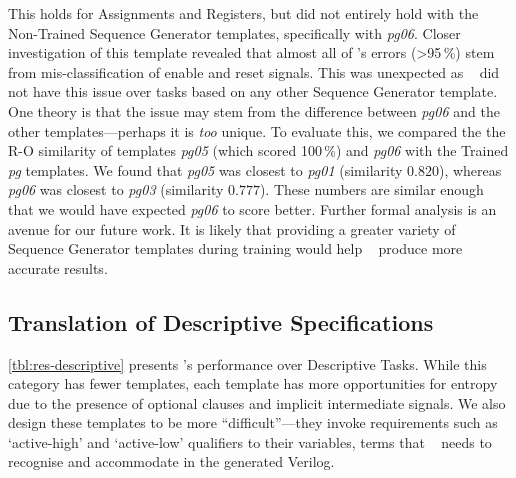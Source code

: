 This holds for Assignments and Registers, but did not entirely hold with the Non-Trained Sequence Generator templates, specifically with \textit{pg06}.
Closer investigation of this template revealed that almost all of \sol's errors (>95\,\%) stem from mis-classification of enable and reset signals. This was unexpected as \sol~ did not have this issue over tasks based on any other Sequence Generator template.
One theory is that the issue may stem from the difference between \textit{pg06} and the other templates---perhaps it is \emph{too} unique. 
To evaluate this, we compared the the R-O similarity of templates \textit{pg05} (which scored 100\,\%) and \textit{pg06} with the Trained \textit{pg} templates.
We found that \textit{pg05} was closest to \textit{pg01} (similarity $0.820$), whereas \textit{pg06} was closest to \textit{pg03} (similarity $0.777$).
These numbers are similar enough that we would have expected \textit{pg06} to score better. Further formal analysis is an avenue for our future work. It is likely that providing a greater variety of Sequence Generator templates during training would help \sol~ produce more accurate results.





\subsection{Translation of Descriptive Specifications}
\label{sec:translation-descriptive}

\autoref{tbl:res-descriptive} presents \sol's performance over Descriptive Tasks. 
While this category has fewer templates, each template has more opportunities for entropy due to the presence of optional clauses and implicit intermediate signals. %
We also design these templates to be more ``difficult''---they invoke requirements such as `active-high' and `active-low' qualifiers to their variables, terms that \sol~ needs to recognise and accommodate in the generated Verilog.

